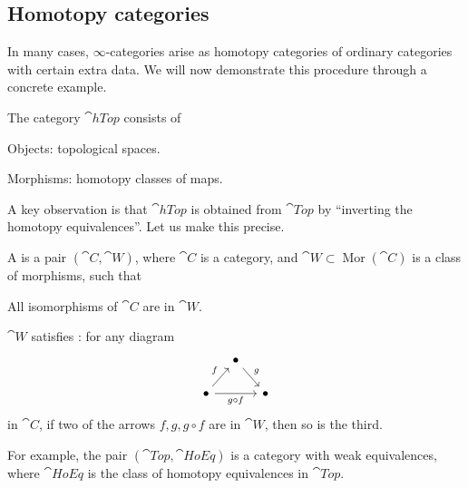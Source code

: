 \subsection{Homotopy categories}

In many cases, $\infty$-categories arise as homotopy categories of ordinary categories with certain extra data.
We will now demonstrate this procedure through a concrete example.

\begin{definition}
    The category $\cat{hTop}$ consists of
    \begin{itms}
        \item Objects: topological spaces.
        \item Morphisms: homotopy classes of maps.
    \end{itms}
\end{definition}

A key observation is that $\cat{hTop}$ is obtained from $\cat{Top}$
by ``inverting the homotopy equivalences''. Let us make this precise.

\begin{definition}
    A 
    is a pair $(\cat{C},\cat{W})$,
    where $\cat{C}$ is a category,
    and $\cat{W}\subset\operatorname{Mor}(\cat C)$ is a class of morphisms, such that
    \begin{itms}
        \item All isomorphisms of $\cat{C}$ are in $\cat{W}$.
        \item $\cat{W}$ satisfies : for any diagram
        \[ \begin{tikzcd}[column sep=10pt,row sep=15pt]
            & \bullet\ar[rd,"g"] &   \\
            \bullet\ar[rr,"g\circ f"']\ar[ru,"f"] &   & \bullet 
        \end{tikzcd} \]
        in $\cat{C}$, if two of the arrows $f,g,g\circ f$ are in $\cat{W}$, then so is the third.
    \end{itms}
\end{definition}

For example, the pair $(\cat{Top},\cat{HoEq})$ is a category with weak equivalences,
where $\cat{HoEq}$ is the class of homotopy equivalences in $\cat{Top}$.

